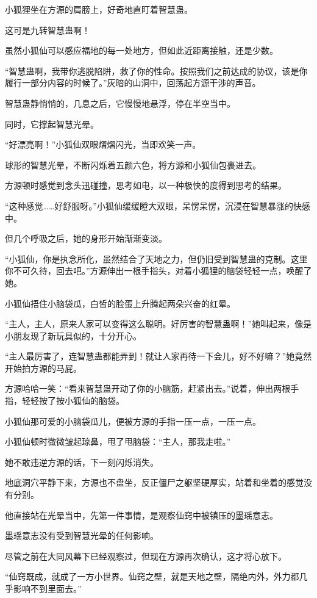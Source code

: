 \begin{this_body}
小狐狸坐在方源的肩膀上，好奇地直盯着智慧蛊。

这可是九转智慧蛊啊！

虽然小狐仙可以感应福地的每一处地方，但如此近距离接触，还是少数。

“智慧蛊啊，我带你逃脱陷阱，救了你的性命。按照我们之前达成的协议，该是你履行一部分内容的时候了。”灰暗的山洞中，回荡起方源干涉的声音。

智慧蛊静悄悄的，几息之后，它慢慢地悬浮，停在半空当中。

同时，它撑起智慧光晕。

“好漂亮啊！”小狐仙双眼熠熠闪光，当即欢笑一声。

球形的智慧光晕，不断闪烁着五颜六色，将方源和小狐仙包裹进去。

方源顿时感觉到念头迅碰撞，思考如电，以一种极快的度得到思考的结果。

“这种感觉……好舒服呀。”小狐仙缓缓瞪大双眼，呆愣呆愣，沉浸在智慧暴涨的快感中。

但几个呼吸之后，她的身形开始渐渐变淡。

“小狐仙，你是执念所化，虽然结合了天地之力，但仍旧受到智慧蛊的克制。这里你不可久待，回去吧。”方源伸出一根手指头，对着小狐狸的脑袋轻轻一点，唤醒了她。

小狐仙捂住小脑袋瓜，白皙的脸蛋上升腾起两朵兴奋的红晕。

“主人，主人，原来人家可以变得这么聪明。好厉害的智慧蛊啊！”她叫起来，像是小朋友现了新玩具似的，十分开心。

“主人最厉害了，连智慧蛊都能弄到！就让人家再待一下会儿，好不好嘛？”她竟然开始拍方源的马屁。

方源哈哈一笑：“看来智慧蛊开动了你的小脑筋，赶紧出去。”说着，伸出两根手指，轻轻按了按小狐仙的脑袋。

小狐仙那可爱的小脑袋瓜儿，便被方源的手指一压一点，一压一点。

小狐仙顿时微微皱起琼鼻，甩了甩脑袋：“主人，那我走啦。”

她不敢违逆方源的话，下一刻闪烁消失。

地底洞穴平静下来，方源也不盘坐，反正僵尸之躯坚硬厚实，站着和坐着的感觉没有分别。

他直接站在光晕当中，先第一件事情，是观察仙窍中被镇压的墨瑶意志。

墨瑶意志没有受到智慧光晕的任何影响。

尽管之前在大同风幕下已经观察过，但现在方源再次确认，这才将心放下。

“仙窍既成，就成了一方小世界。仙窍之壁，就是天地之壁，隔绝内外，外力都几乎影响不到里面去。”


\end{this_body}
